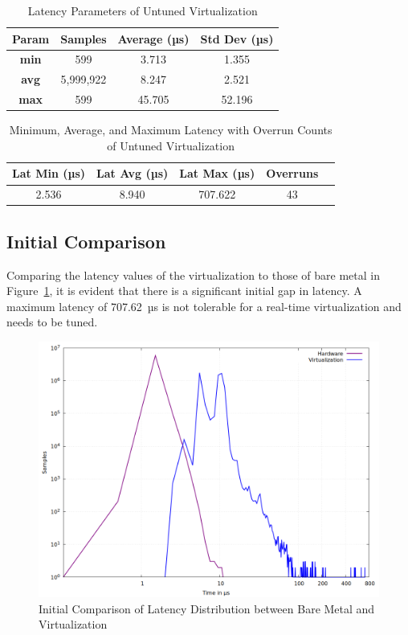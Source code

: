 \documentclass[MMR,Master,english]{style/twbook}
\begin{document}
\begin{table}[H]
	\centering
	\caption{Latency Parameters of Untuned Virtualization}
	\label{tab:latency_stats_virt}
	\begin{tabular}{|c|c|c|c|}
		\hline
		\textbf{Param} & \textbf{Samples} & \textbf{Average (µs)} & \textbf{Std Dev (µs)} \\ \hline
		\textbf{min}   & 599              & 3.713                 & 1.355                 \\ \hline
		\textbf{avg}   & 5,999,922        & 8.247                 & 2.521                 \\ \hline
		\textbf{max}   & 599              & 45.705                & 52.196                \\ \hline
	\end{tabular}
\end{table}

\begin{table}[H]
	\centering
	\caption[Latency Statistics with Overrun Counts of Untuned Virtualization]{Minimum, Average, and Maximum Latency with Overrun Counts of Untuned Virtualization}
	\label{tab:latency_overrun_msw_new_virt}
	\begin{tabular}{|c|c|c|c|c|}
		\hline
		\textbf{Lat Min (µs)} & \textbf{Lat Avg (µs)} & \textbf{Lat Max (µs)} & \textbf{Overruns} \\ \hline
		2.536                 & 8.940                 & 707.622               & 43                \\ \hline
	\end{tabular}
\end{table}

\subsection{Initial Comparison}
\noindent Comparing the latency values of the virtualization to those of bare metal in Figure~\ref{fig:gnuplot_max_latency_combined}, it is evident that there is a significant initial gap in latency. A maximum latency of 707.62~µs is not tolerable for a real-time virtualization and needs to be tuned.

\begin{figure}[H]
	\centering
	\includegraphics[width=0.7\columnwidth]{img/implementation/gnuplot_combined_max_latency.png}
	\caption[Initial Comparison of Latency Distribution]{Initial Comparison of Latency Distribution between Bare Metal and Virtualization}
	\label{fig:gnuplot_max_latency_combined}
\end{figure}
\end{document}
